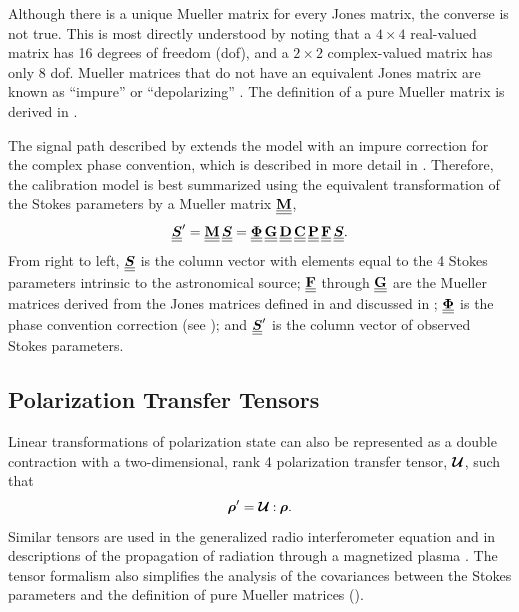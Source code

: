 
Although there is a unique Mueller matrix for every Jones matrix, the converse is not true.
%
This is most directly understood by noting that a $4\times 4$ real-valued matrix has 16 degrees of freedom (dof), and a $2\times 2$ complex-valued matrix has only 8 dof.
%
Mueller matrices that do not have an equivalent
Jones matrix are known as ``impure'' or ``depolarizing'' \citep[e.g.,][and ]{hbs96,lc96}.
%
The definition of a pure Mueller matrix is derived in .

The signal path described by \cite{vmjr10} extends the \citet{hbs96} model with an impure correction for the complex phase convention, which is described
in more detail in .
%
Therefore, the \cite{vmjr10} calibration model is best summarized
using the equivalent transformation of the Stokes parameters
by a Mueller matrix $\underline{\underline{{\bf M}}}$,
\begin{equation}
\underline{\underline{\mbox{\boldmath $S$}}}' = \underline{\underline{{\bf M}}} \, \underline{\underline{\mbox{\boldmath $S$}}} = \underline{\underline{{\bf \Phi}}} \, \underline{\underline{{\bf G}}} \, \underline{\underline{{\bf D}}} \, \underline{\underline{{\bf C}}} \, \underline{\underline{{\bf P}}} \, \underline{\underline{{\bf F}}}\, \underline{\underline{\mbox{\boldmath $S$}}}.
\label{eqn:Stokes_chain}
\end{equation}
From right to left, $\underline{\underline{\mbox{\boldmath $S$}}}$ is the column vector with elements equal to the 4 Stokes parameters intrinsic to the astronomical source;
%
$\underline{\underline{{\bf F}}}$ through $\underline{\underline{{\bf G}}}$ are the Mueller matrices derived from the Jones matrices defined in  and discussed in ;
%
$\underline{\underline{{\bf \Phi}}}$ is the phase convention correction
(see );
%
and $\underline{\underline{\mbox{\boldmath $S$}}}'$ is the column vector of observed Stokes parameters.
%


\subsection{Polarization Transfer Tensors}
\label{sec:polarization_transfer_tensor}


Linear transformations of polarization state can also be represented 
as a double contraction  with a two-dimensional, rank 4 polarization transfer tensor, $\mbox{\boldmath $\mathcal{U}$}$, such that
%
\begin{equation}
\label{eqn:polarization_transfer_tensor}
\mbox{\boldmath $\rho$}' = \mbox{\boldmath $\mathcal{U}$} \mathbin{:} \mbox{\boldmath $\rho$}.
\end{equation}
%
Similar tensors are used in the generalized radio interferometer equation \citep{smi11d} and in descriptions of the propagation of radiation through a magnetized plasma \citep[e.g.,][]{kaw64,zhe68}.  The tensor formalism also simplifies the analysis of the covariances between the Stokes parameters \citep{vt17} and the definition of pure Mueller matrices ().


